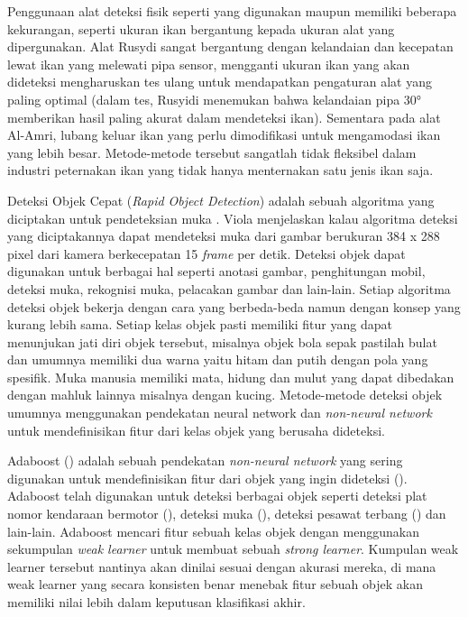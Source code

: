 Penggunaan alat deteksi fisik seperti yang digunakan \cite{alamri} maupun 
\cite{rusydi} memiliki beberapa kekurangan, seperti ukuran ikan bergantung 
kepada ukuran alat yang dipergunakan. Alat Rusydi sangat bergantung 
dengan kelandaian dan kecepatan lewat ikan yang melewati pipa sensor, mengganti 
ukuran ikan yang akan dideteksi mengharuskan tes ulang untuk 
mendapatkan pengaturan alat yang paling optimal (dalam tes, Rusyidi 
menemukan bahwa kelandaian pipa 30° memberikan hasil paling akurat dalam 
mendeteksi ikan). Sementara pada alat Al-Amri, lubang keluar 
ikan yang perlu dimodifikasi untuk mengamodasi ikan yang lebih besar. 
Metode-metode tersebut sangatlah tidak fleksibel dalam industri peternakan 
ikan yang tidak hanya menternakan satu jenis ikan saja.

Deteksi Objek Cepat (\emph{Rapid Object Detection}) adalah sebuah algoritma yang 
diciptakan untuk pendeteksian muka \cite{violaetal}. Viola 
menjelaskan kalau algoritma deteksi yang diciptakannya dapat mendeteksi 
muka dari gambar berukuran 384 x 288 pixel dari kamera berkecepatan 15 
\textit{frame} per detik. Deteksi objek dapat digunakan untuk berbagai hal seperti 
anotasi gambar, penghitungan mobil, deteksi muka, rekognisi muka, pelacakan 
gambar dan lain-lain. Setiap algoritma deteksi objek bekerja dengan cara yang 
berbeda-beda namun dengan konsep yang kurang lebih sama. Setiap kelas objek 
pasti memiliki fitur yang dapat menunjukan jati diri objek tersebut, misalnya 
objek bola sepak pastilah bulat dan umumnya memiliki dua warna yaitu hitam dan 
putih dengan pola yang spesifik. Muka manusia memiliki mata, hidung dan mulut 
yang dapat dibedakan dengan mahluk lainnya misalnya dengan kucing. Metode-metode 
deteksi objek umumnya menggunakan pendekatan neural network dan 
\textit{non-neural network} untuk mendefinisikan fitur dari kelas objek yang 
berusaha dideteksi.

Adaboost (\cite{freundetal}) adalah sebuah pendekatan \textit{non-neural network} 
yang sering digunakan untuk mendefinisikan fitur dari objek yang ingin 
dideteksi (\cite{weber}). Adaboost telah digunakan untuk deteksi berbagai objek 
seperti deteksi plat nomor kendaraan bermotor (\cite{hoetal}), deteksi muka 
(\cite{violaetal}), deteksi pesawat terbang (\cite{freundetal}) dan lain-lain. 
Adaboost mencari fitur sebuah kelas objek dengan menggunakan sekumpulan 
\emph{weak learner} untuk membuat sebuah \emph{strong learner}. 
Kumpulan weak learner tersebut nantinya akan dinilai sesuai dengan akurasi 
mereka, di mana weak learner yang secara konsisten benar menebak fitur sebuah 
objek akan memiliki nilai lebih dalam keputusan klasifikasi akhir.

